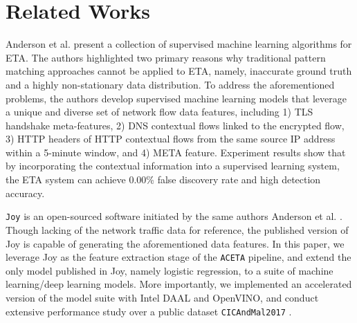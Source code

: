 \section{Related Works}
\label{sec:related}

Anderson et al. \cite{Anderson:2016, Anderson:2017} present a collection of supervised machine learning algorithms for ETA. The authors highlighted two primary reasons why traditional pattern matching approaches cannot be applied to ETA, namely, inaccurate ground truth and a highly non-stationary data distribution. To address the aforementioned problems, the authors develop supervised machine learning models that leverage a unique and diverse set of network flow data features, including 1) TLS handshake meta-features, 2) DNS contextual flows linked to the encrypted flow, 3) HTTP headers of HTTP contextual flows from the same source IP address within a 5-minute window, and 4) META feature. Experiment results show that by incorporating the contextual information into a supervised learning system, the ETA system can achieve 0.00\% false discovery rate and high detection accuracy. 

\texttt{Joy} \cite{joy} is an open-sourced software initiated by the same authors Anderson et al. \cite{Anderson:2016, Anderson:2017}. Though lacking of the network traffic data for reference, the published version of Joy is capable of generating the aforementioned data features. In this paper, we leverage Joy as the feature extraction stage of the \texttt{ACETA} pipeline, and extend the only model published in Joy, namely logistic regression, to a suite of machine learning/deep learning models. More importantly, we implemented an accelerated version of the model suite with Intel DAAL and OpenVINO, and conduct extensive performance study over a public dataset \texttt{CICAndMal2017} \cite{cicandmal2017}.